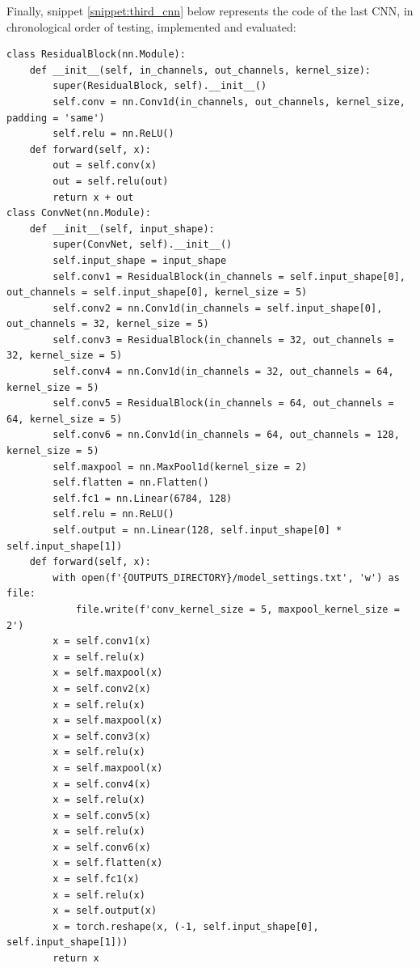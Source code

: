 \documentclass[12pt,english]{report}
\begin{document}
Finally, snippet \ref{snippet:third_cnn} below represents the code of the last CNN, in chronological order of testing, implemented and evaluated:

\lstset{language=Python}
\begin{lstlisting}[aboveskip=15pt, belowskip=15pt, basicstyle=\fontsize{8}{10}\selectfont, keywordstyle=\color{blue}, breaklines=true, label=snippet:third_cnn]
class ResidualBlock(nn.Module):
    def __init__(self, in_channels, out_channels, kernel_size):
        super(ResidualBlock, self).__init__()
        self.conv = nn.Conv1d(in_channels, out_channels, kernel_size, padding = 'same')
        self.relu = nn.ReLU()
    def forward(self, x):
        out = self.conv(x)
        out = self.relu(out)
        return x + out
class ConvNet(nn.Module):
    def __init__(self, input_shape):
        super(ConvNet, self).__init__()
        self.input_shape = input_shape
        self.conv1 = ResidualBlock(in_channels = self.input_shape[0], out_channels = self.input_shape[0], kernel_size = 5)
        self.conv2 = nn.Conv1d(in_channels = self.input_shape[0], out_channels = 32, kernel_size = 5)
        self.conv3 = ResidualBlock(in_channels = 32, out_channels = 32, kernel_size = 5)
        self.conv4 = nn.Conv1d(in_channels = 32, out_channels = 64, kernel_size = 5)
        self.conv5 = ResidualBlock(in_channels = 64, out_channels = 64, kernel_size = 5)
        self.conv6 = nn.Conv1d(in_channels = 64, out_channels = 128, kernel_size = 5)
        self.maxpool = nn.MaxPool1d(kernel_size = 2)
        self.flatten = nn.Flatten()
        self.fc1 = nn.Linear(6784, 128)
        self.relu = nn.ReLU()
        self.output = nn.Linear(128, self.input_shape[0] * self.input_shape[1])
    def forward(self, x):
        with open(f'{OUTPUTS_DIRECTORY}/model_settings.txt', 'w') as file:
            file.write(f'conv_kernel_size = 5, maxpool_kernel_size = 2')
        x = self.conv1(x)
        x = self.relu(x)
        x = self.maxpool(x)
        x = self.conv2(x)
        x = self.relu(x)
        x = self.maxpool(x)
        x = self.conv3(x)
        x = self.relu(x)
        x = self.maxpool(x)
        x = self.conv4(x)
        x = self.relu(x)
        x = self.conv5(x)
        x = self.relu(x)
        x = self.conv6(x)
        x = self.flatten(x)
        x = self.fc1(x)
        x = self.relu(x)
        x = self.output(x)
        x = torch.reshape(x, (-1, self.input_shape[0], self.input_shape[1]))
        return x


\end{lstlisting}
\end{document}
